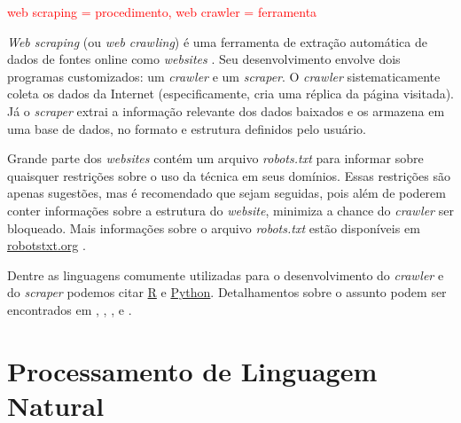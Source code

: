\documentclass{automatextcc}
\newcommand{\pumi}[1]{\textcolor{red}{#1}}
\begin{document}
\pumi{web scraping = procedimento, web crawler = ferramenta}

\textit{Web scraping} (ou \textit{web crawling}) é uma ferramenta de extração automática de dados de fontes online como \textit{websites} \citep{farley2017,khder2021}. Seu desenvolvimento envolve dois programas customizados: um \textit{crawler} e um \textit{scraper}. O \textit{crawler} sistematicamente coleta os dados da Internet (especificamente, cria uma réplica da página visitada). Já o \textit{scraper} extrai a informação relevante dos dados baixados e os armazena em uma base de dados, no formato e estrutura definidos pelo usuário. \citep{lawson2015,patil2016}

Grande parte dos \textit{websites} contém um arquivo \textit{robots.txt} para informar sobre quaisquer restrições sobre o uso da técnica em seus domínios. Essas restrições são apenas sugestões, mas é recomendado que sejam seguidas, pois além de poderem conter informações sobre a estrutura do \textit{website}, minimiza a chance do \textit{crawler} ser bloqueado. Mais informações sobre o arquivo \textit{robots.txt} estão disponíveis em \url{robotstxt.org} \citep{lawson2015}.

Dentre as linguagens comumente utilizadas para o desenvolvimento do \textit{crawler} e do \textit{scraper} podemos citar \href{https://cran.r-project.org}{R} e \href{https://python.org/}{Python}. Detalhamentos sobre o assunto podem ser encontrados em \citet{lawson2015}, \citet{sirisuriya2015}, \citet{patil2016}, \citet{farley2017} e \citet{khder2021}.

\section{Processamento de Linguagem Natural}
\end{document}

